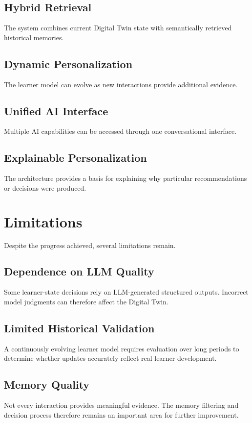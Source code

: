 \documentclass[12pt,a4paper]{article}
\begin{document}
\subsection{Hybrid Retrieval}
The system combines current Digital Twin state with semantically retrieved historical memories.

\subsection{Dynamic Personalization}
The learner model can evolve as new interactions provide additional evidence.

\subsection{Unified AI Interface}
Multiple AI capabilities can be accessed through one conversational interface.

\subsection{Explainable Personalization}
The architecture provides a basis for explaining why particular recommendations or decisions were produced.

\section{Limitations}
Despite the progress achieved, several limitations remain.

\subsection{Dependence on LLM Quality}
Some learner-state decisions rely on LLM-generated structured outputs. Incorrect model judgments can therefore affect the Digital Twin.

\subsection{Limited Historical Validation}
A continuously evolving learner model requires evaluation over long periods to determine whether updates accurately reflect real learner development.

\subsection{Memory Quality}
Not every interaction provides meaningful evidence. The memory filtering and decision process therefore remains an important area for further improvement.
\end{document}
